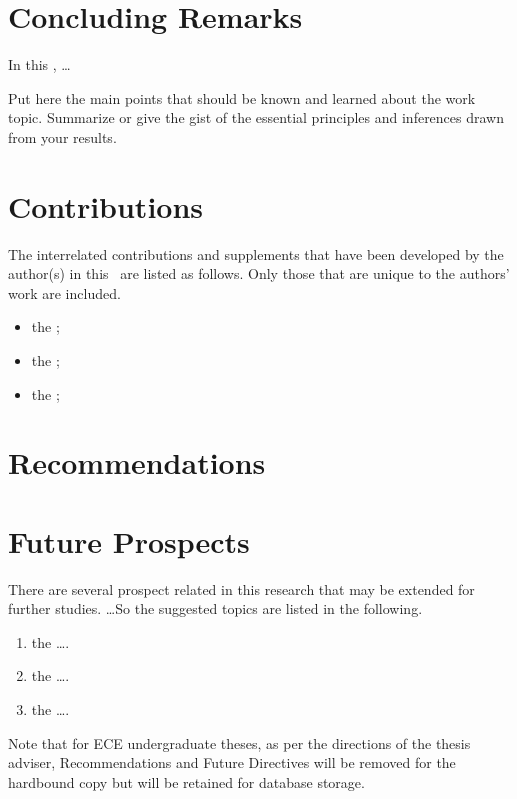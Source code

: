 \section{Concluding Remarks}

In this \documentType, \ldots

Put here the main points that should be known and learned about the  work topic. Summarize or give the gist of the essential principles and inferences drawn from your results.

\section{Contributions}

The interrelated  contributions and supplements that have been developed by the author(s) in this \documentType \ are listed as follows.  Only those that are unique to the authors' work are included.

\begin{itemize}
  \item the ; 
	
	\item the ; 
  
  \item the ; 
	
\end{itemize}


\section{Recommendations}

\graytx{\Blindtext}

\section{Future Prospects}

There are several prospect related in this research that may be extended for further studies. \ldots So the suggested topics are listed in the following.

\begin{enumerate}
	\item  the \ldots.
	
	\item  the \ldots.
		
	\item  the \ldots.
\end{enumerate}

Note that for ECE undergraduate theses, as per the directions of the thesis adviser, Recommendations and Future Directives will be removed for the hardbound copy but will be retained for database storage.

